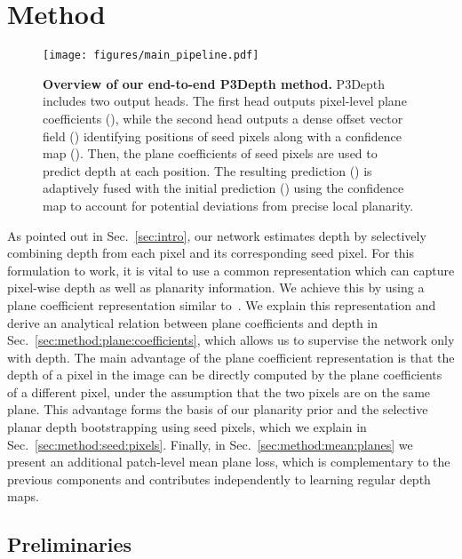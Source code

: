 \documentclass[final]{cvpr}
\begin{document}
\section{Method}
\label{sec:method}

\begin{figure*}[!t]
    \centering
    \texttt{[image: figures/main\_pipeline.pdf]}
    \caption{\textbf{Overview of our end-to-end P3Depth method.} P3Depth includes two output heads. The first head outputs pixel-level plane coefficients (), while the second head outputs a dense offset vector field () identifying positions of seed pixels along with a confidence map (). Then, the plane coefficients of seed pixels are used to predict depth at each position. The resulting prediction () is adaptively fused with the initial  prediction () using the confidence map to account for potential deviations from precise local planarity.}
    \label{fig:main_pipeline}
    \vspace{-0.3cm}
\end{figure*}

As pointed out in Sec.~\ref{sec:intro}, our network estimates depth by selectively combining depth from each pixel and its corresponding seed pixel. For this formulation to work, it is vital to use a common representation which can capture pixel-wise depth as well as planarity information. We achieve this by using a plane coefficient representation similar to~\cite{geolayout}. We explain this representation and derive an analytical relation between plane coefficients and depth in Sec.~\ref{sec:method:plane:coefficients}, which allows us to supervise the network only with depth. The main advantage of the plane coefficient representation is that the depth of a pixel in the image can be directly computed by the plane coefficients of a different pixel, under the assumption that the two pixels are on the same plane. This advantage forms the basis of our planarity prior and the selective planar depth bootstrapping using seed pixels, which we explain in Sec.~\ref{sec:method:seed:pixels}. Finally, in Sec.~\ref{sec:method:mean:planes} we present an additional patch-level mean plane loss, which is complementary to the previous components and contributes independently to learning regular depth maps.

\subsection{Preliminaries}
\label{sec:method:preliminaries}
\end{document}
